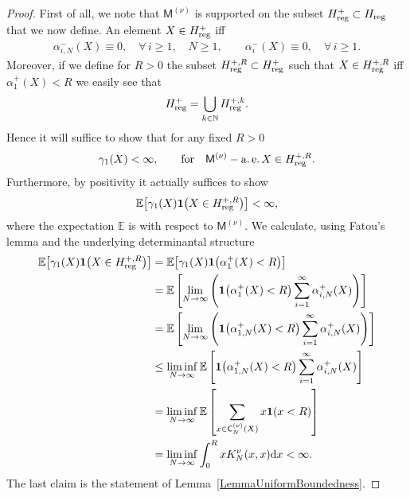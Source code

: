 \documentclass[pdftex]{sigma}
\numberwithin{equation}{section}
\begin{document}
\begin{proof}First of all, we note that $\mathsf{M}^{(\nu)}$ is supported on the subset $H^{+}_{{\rm reg}}\subset H_{{\rm reg}}$ that we now define. An element $X \in H^+_{{\rm reg}}$ iff
\begin{gather*}
\alpha_{i,N}^-(X)\equiv 0, \quad \forall\, i\ge 1, \quad N\ge 1, \qquad \alpha_i^-(X) \equiv 0, \quad \forall\, i \ge 1.
\end{gather*}
Moreover, if we define for $R>0$ the subset $H^{+,R}_{{\rm reg}}\subset H^{+}_{{\rm reg}}$ such that $X \in H^{+,R}_{{\rm reg}}$ iff $\alpha_1^+(X)<R$ we easily see that
\begin{gather*}
H^{+}_{{\rm reg}}=\bigcup_{k \in \mathbb{N}} H^{+,k}_{{\rm reg}}.
\end{gather*}
Hence it will suffice to show that for any fixed $R>0$
\begin{gather*}
\gamma_1(X)<\infty, \qquad \text{for} \quad \mathsf{M}^{(\nu)}-\operatorname{a.e.} X \in H^{+,R}_{{\rm reg}}.
\end{gather*}
Furthermore, by positivity it actually suffices to show
\begin{gather*}
\mathbb{E}\big[\gamma_1(X) \textbf{1}\big(X \in H_{{\rm reg}}^{+,R}\big)\big]<\infty,
\end{gather*}
where the expectation $\mathbb{E}$ is with respect to $\mathsf{M}^{(\nu)}$. We calculate, using Fatou's lemma and the underlying determinantal structure
\begin{align*}
\mathbb{E}\big[\gamma_1(X) \textbf{1}\big(X \in H_{{\rm reg}}^{+,R}\big)\big]&=\mathbb{E}\big[\gamma_1(X) \textbf{1}\big(\alpha_1^+(X)<R\big)\big]\\
&=\mathbb{E}\left[\lim_{N\to \infty} \left(\textbf{1}\big(\alpha_1^+(X)<R\big)\sum_{i=1}^{\infty}\alpha_{i,N}^+(X)\right)\right]\\
&=\mathbb{E}\left[\lim_{N\to \infty} \left(\textbf{1}\big(\alpha_{1,N}^+(X)<R\big)\sum_{i=1}^{\infty}\alpha_{i,N}^+(X)\right)\right]\\
&\le\liminf_{N \to \infty}\mathbb{E}\left[\textbf{1}\big(\alpha_{1,N}^+(X)<R\big)\sum_{i=1}^{\infty}\alpha_{i,N}^+(X)\right]\\
&=\liminf_{N \to \infty}\mathbb{E}\left[\sum_{x \in \mathsf{C}_N^{(\nu)}(X)}x\textbf{1} (x<R )\right]\\
&=\liminf_{N \to \infty}\int_{0}^{R}x K_N^{\nu}(x,x){\rm d}x<\infty.
\end{align*}
The last claim is the statement of Lemma~\ref{LemmaUniformBoundedness}.
\end{proof}
\end{document}

